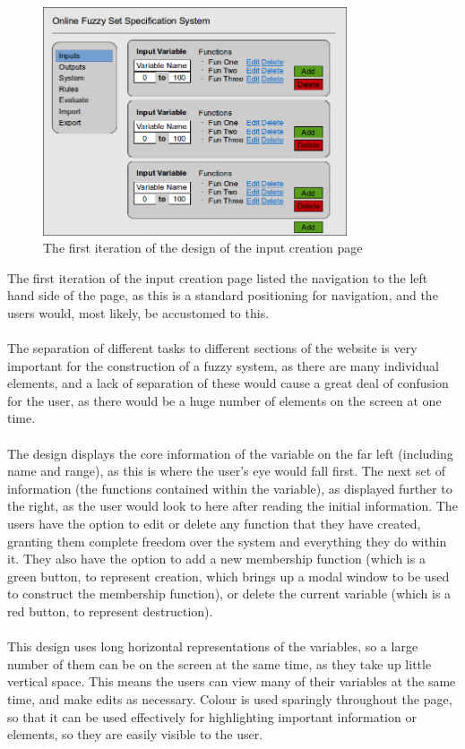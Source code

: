 \begin{figure}[ht!]
\begin{center}
\includegraphics[width=0.8\textwidth]{images/firstItInputs}
\end{center}
\caption{The first iteration of the design of the input creation page}
\label{fig:design-firstIterationInputs}
\end{figure}
\noindent 
The first iteration of the input creation page listed the navigation to the left hand side of the page, as this is a standard positioning for navigation, and the users would, most likely, be accustomed to this. \ \\
\ \\
The separation of different tasks to different sections of the website is very important for the construction of a fuzzy system, as there are many individual elements, and a lack of separation of these would cause a great deal of confusion for the user, as there would be a huge number of elements on the screen at one time.\ \\
\ \\
The design displays the core information of the variable on the far left (including name and range), as this is where the user's eye would fall first. The next set of information (the functions contained within the variable), as displayed further to the right, as the user would look to here after reading the initial information. The users have the option to edit or delete any function that they have created, granting them complete freedom over the system and everything they do within it. They also have the option to add a new membership function (which is a green button, to represent creation, which brings up a modal window to be used to construct the membership function), or delete the current variable (which is a red button, to represent destruction). \ \\
\ \\
This design uses long horizontal representations of the variables, so a large number of them can be on the screen at the same time, as they take up little vertical space. This means the users can view many of their variables at the same time, and make edits as necessary. Colour is used sparingly throughout the page, so that it can be used effectively for highlighting important information or elements, so they are easily visible to the user.

